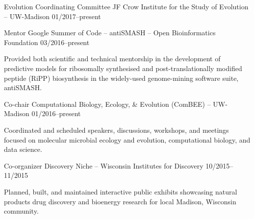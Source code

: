 

\begin{cventries}

  \cventry
    {Evolution Coordinating Committee} %
    {JF Crow Institute for the Study of Evolution -- UW-Madison} %
    {} %
    {01/2017--present} %
    {
    }

  \cventry
    {Mentor} %
    {Google Summer of Code -- antiSMASH -- Open Bioinformatics Foundation} %
    {} %
    {03/2016--present} %
    {
      \begin{cvitems} %
        \item {Provided both scientific and technical mentorship in the development of predictive models for ribosomally synthesised and post-translationally modified peptide (RiPP) biosynthesis in the widely-used genome-mining software suite, antiSMASH.}
      \end{cvitems}
    }
    
  \cventry
    {Co-chair} %
    {Computational Biology, Ecology, \& Evolution (ComBEE) -- UW-Madison} %
    {} %
    {01/2016--present} %
    {
      \begin{cvitems} %
        \item {Coordinated and scheduled speakers, discussions, workshops, and meetings focused on molecular microbial ecology and evolution, computational biology, and data science.}
      \end{cvitems}
    }

    
  \cventry
    {Co-organizer} %
    {Discovery Niche -- Wisconsin Institutes for Discovery} %
    {} %
    {10/2015--11/2015} %
    {
      \begin{cvitems} %
        \item {Planned, built, and maintained interactive public exhibits showcasing natural products drug discovery and bioenergy research for local Madison, Wisconsin community.}
      \end{cvitems}
    }
    

\end{cventries}
